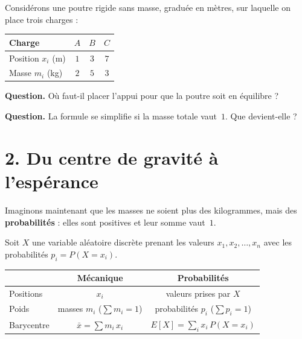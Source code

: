 Considérons une poutre rigide sans masse, graduée en mètres,
sur laquelle on place trois charges :

\begin{center}
\renewcommand{\arraystretch}{1.3}
\begin{tabular}{lccc}
  \hline
  \textbf{Charge} & $A$ & $B$ & $C$ \\
  \hline
  Position $x_i$ (m) & $1$ & $3$ & $7$ \\
  Masse $m_i$ (kg)   & $2$ & $5$ & $3$ \\
  \hline
\end{tabular}
\end{center}

\textbf{Question.}
Où faut-il placer l'appui pour que la poutre soit en équilibre ?


\textbf{Question.}
La formule se simplifie si la masse totale vaut~$1$.
Que devient-elle ?

\atrou[2cm]{%
\[
  \bar{x} = \sum_{i} m_i \, x_i.
\]
}

\section*{2. Du centre de gravité à l'espérance}

Imaginons maintenant que les \og masses \fg{} ne soient plus
des kilogrammes, mais des \textbf{probabilités} :
elles sont positives et leur somme vaut~$1$.

\medskip

Soit $X$ une variable aléatoire discrète prenant les valeurs
$x_1, x_2, \dots, x_n$ avec les probabilités
$p_i = P(X = x_i)$.

\begin{center}
\renewcommand{\arraystretch}{1.5}
\begin{tabular}{|l|c|c|}
  \hline
  & \textbf{Mécanique} & \textbf{Probabilités} \\
  \hline
  Positions
    & $x_i$
    & valeurs prises par $X$ \\
  Poids
    & masses $m_i$ \;($\sum m_i = 1$)
    & probabilités $p_i$ \;($\sum p_i = 1$) \\
  Barycentre
    & $\displaystyle\bar{x} = \sum m_i\, x_i$
    & $\displaystyle E[X] = \sum_i x_i\, P(X = x_i)$ \\
  \hline
\end{tabular}
\end{center}

